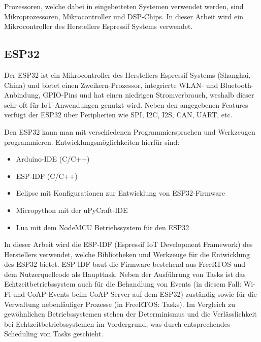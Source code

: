 \noindent Prozessoren, welche dabei in eingebetteten Systemen verwendet werden, sind Mikroprozessoren, Mikrocontroller und \ac{DSP}-Chips. \cite{barr_programming_2006} \cite{marwedel_eingebettete_2008} In dieser Arbeit wird ein Mikrocontroller des
Herstellers Espressif Systems verwendet.

\subsection{ESP32}
\label{esp32-definition}

Der ESP32 ist ein Mikrocontroller \cite{hercog_design_2023} des Herstellers Espressif Systems (Shanghai, China) und bietet einen Zweikern-Prozessor, integrierte \ac{WLAN}- und Bluetooth-%
Anbindung, \ac{GPIO}-Pins und hat einen niedrigen Stromverbrauch, weshalb dieser sehr oft für IoT-Anwendungen genutzt wird. \cite{hercog_design_2023} \cite{farhan_real-time_2026}
Neben den angegebenen Features verfügt der ESP32 über Peripherien wie \ac{SPI}, \ac{I2C}, \ac{I2S}, \ac{CAN}, \ac{UART}, etc. \cite{brandes_mikrocontroller_2024}

\noindent Den ESP32 kann man mit verschiedenen Programmiersprachen und Werkzeugen programmieren. Entwicklungsmöglichkeiten hierfür sind:

\begin{itemize}
    \item Arduino-\ac{IDE} (C/C++)
    \item \ac{ESP-IDF} (C/C++)
    \item Eclipse mit Konfigurationen zur Entwicklung von ESP32-Firmware 
    \item Micropython mit der uPyCraft-IDE 
    \item Lua mit dem NodeMCU Betriebssystem für den ESP32
\end{itemize} \cite{brandes_mikrocontroller_2024}

\noindent In dieser Arbeit wird die ESP-IDF (Espressif IoT Development Framework) des Herstellers verwendet, welche Bibliotheken und Werkzeuge für die 
Entwicklung des ESP32 bietet. \cite{hercog_design_2023} ESP-IDF baut die Firmware bestehend aus FreeRTOS und dem Nutzerquellcode als Haupttask. Neben der
Ausführung von Tasks ist das Echtzeitbetriebssystem auch für die Behandlung von Events (in diesem Fall: Wi-Fi und CoAP-Events beim CoAP-Server auf dem ESP32) zuständig \cite{zuiev_research_2024} sowie für die Verwaltung
nebenläufiger Prozesse (in FreeRTOS: Tasks). Im Vergleich zu gewöhnlichen Betriebssystemen stehen der Determinismus und die Verlässlichkeit \cite{stallings_operating_2018} bei Echtzeitbetriebssystemen im Vordergrund, was
durch entsprechendes Scheduling von Tasks geschieht. \cite{filiz_freertos_2016} \cite{gay_freertos_2024}


